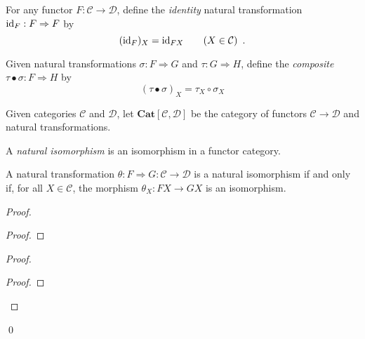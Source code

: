 \begin{df}
For any functor $F : \mathcal{C} \rightarrow \mathcal{D}$, define the \emph{identity} natural transformation $\mathrm{id}_{F} : F \Rightarrow F$ by
\[ (\mathrm{id}_{F})_X = \mathrm{id}_{FX} \qquad (X \in \mathcal{C}) \enspace . \]
\end{df}

\begin{df}
Given natural transformations $\sigma : F \Rightarrow G$ and $\tau : G \Rightarrow H$, define the \emph{composite} $\tau \bullet \sigma : F \Rightarrow H$ by
\[ (\tau \bullet \sigma)_X = \tau_X \circ \sigma_X \]
\end{df}

\begin{df}
Given categories $\mathcal{C}$ and $\mathcal{D}$, let $\mathbf{Cat}[\mathcal{C}, \mathcal{D}]$ be the category of functors $\mathcal{C} \rightarrow \mathcal{D}$ and natural transformations.
\end{df}

\begin{df}
A \emph{natural isomorphism} is an isomorphism in a functor category.
\end{df}

\begin{prop}
A natural transformation $\theta : F \Rightarrow G : \mathcal{C} \rightarrow \mathcal{D}$ is a natural isomorphism if and only if, for all $X \in \mathcal{C}$, the morphism $\theta_X : FX \rightarrow GX$ is an isomorphism.
\end{prop}

\begin{proof}
\pf
{}
\begin{proof}
\end{proof}
\begin{proof}
	\begin{proof}
	\end{proof}
\end{proof}
\qed
\end{proof}

